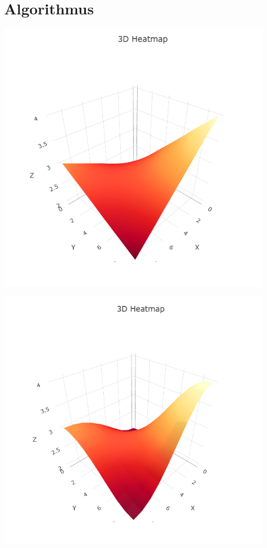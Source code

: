 \chapter{Algorithmus}

\begin{center}
  \begin{minipage}[b]{0.4\textwidth}
    \includegraphics[width=\textwidth]{../images/Heatmap/IBHeatmap.png}
  \end{minipage}
  \hfill
  \begin{minipage}[b]{0.4\textwidth}
    \includegraphics[width=\textwidth]{../images/Heatmap/IDWHeatmap.png}
  \end{minipage}
\end{center}

